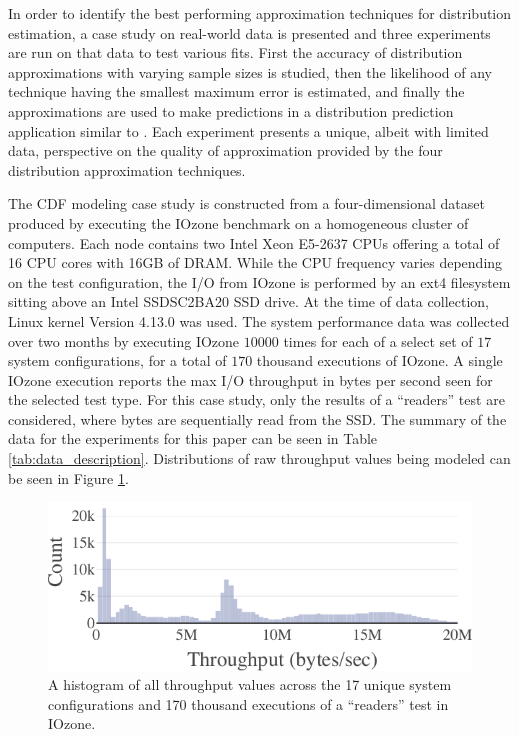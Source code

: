 \documentclass[letterpaper, 10 pt, conference]{ieeeconf}  %
\begin{document}
In order to identify the best performing approximation techniques for distribution estimation, a case study on real-world data is presented and three experiments are run on that data to test various fits. First the accuracy of distribution approximations with varying sample sizes is studied, then the likelihood of any technique having the smallest maximum error is estimated, and finally the approximations are used to make predictions in a distribution prediction application similar to \cite{lux2018nonparametric}. Each experiment presents a unique, albeit with limited data, perspective on the quality of approximation provided by the four distribution approximation techniques.

The CDF modeling case study is constructed from a four-dimensional dataset produced by executing the IOzone benchmark \cite{iozone} on a homogeneous cluster of computers. Each node contains two Intel Xeon E5-2637 CPUs offering a total of 16 CPU cores with 16GB of DRAM. While the CPU frequency varies depending on the test configuration, the I/O from IOzone is performed by an ext4 filesystem sitting above an Intel SSDSC2BA20 SSD drive. At the time of data collection, Linux kernel Version 4.13.0 was used. The system performance data was collected over two months by executing IOzone  $10000$ times for each of a select set of $17$ system configurations, for a total of $170$ thousand executions of IOzone. A single IOzone execution reports the max I/O throughput in bytes per second seen for the selected test type. For this case study, only the results of a ``readers'' test are considered, where bytes are sequentially read from the SSD. The summary of the data for the experiments for this paper can be seen in Table \ref{tab:data_description}. Distributions of raw throughput values being modeled can be seen in Figure \ref{fig:throughput_histogram}.

\begin{figure}
  \vspace{-.3cm}
  \includegraphics[width=.5\textwidth]{throughput-histogram.pdf}
  \caption{A histogram of all throughput values across the 17 unique system configurations and 170 thousand executions of a ``readers'' test in IOzone.}
  \label{fig:throughput_histogram}
\end{figure}
\end{document}
